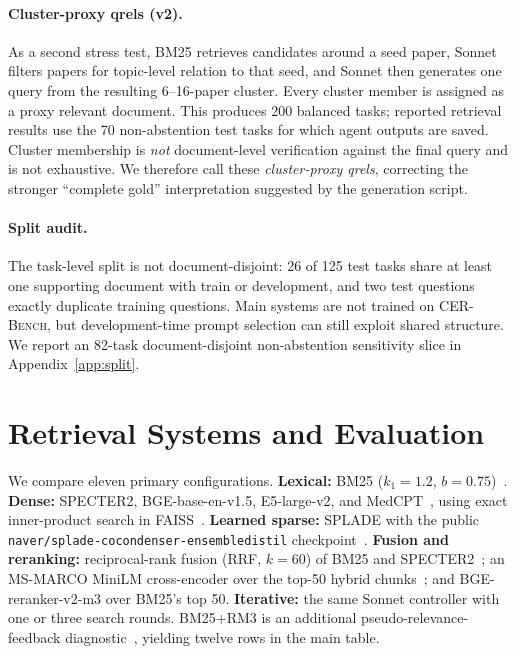 \documentclass{article}
\newcommand{\cer}{\textsc{CER-Bench}}
\begin{document}
\paragraph{Cluster-proxy qrels (v2).}
As a second stress test, BM25 retrieves candidates around a seed paper, Sonnet filters papers for topic-level relation to that seed, and Sonnet then generates one query from the resulting 6--16-paper cluster. Every cluster member is assigned as a proxy relevant document. This produces 200 balanced tasks; reported retrieval results use the 70 non-abstention test tasks for which agent outputs are saved. Cluster membership is \emph{not} document-level verification against the final query and is not exhaustive. We therefore call these \emph{cluster-proxy qrels}, correcting the stronger ``complete gold'' interpretation suggested by the generation script.

\paragraph{Split audit.}
The task-level split is not document-disjoint: 26 of 125 test tasks share at least one supporting document with train or development, and two test questions exactly duplicate training questions. Main systems are not trained on \cer, but development-time prompt selection can still exploit shared structure. We report an 82-task document-disjoint non-abstention sensitivity slice in Appendix~\ref{app:split}.

\section{Retrieval Systems and Evaluation}
\label{sec:methods}

We compare eleven primary configurations. \textbf{Lexical:} BM25 ($k_1{=}1.2$, $b{=}0.75$)~\cite{robertson2009}. \textbf{Dense:} SPECTER2, BGE-base-en-v1.5, E5-large-v2, and MedCPT~\cite{specter2,bge2024,e52022,medcpt2023}, using exact inner-product search in FAISS~\cite{johnson2019faiss}. \textbf{Learned sparse:} SPLADE with the public \texttt{naver/splade-cocondenser-ensembledistil} checkpoint~\cite{splade2022}. \textbf{Fusion and reranking:} reciprocal-rank fusion (RRF, $k{=}60$) of BM25 and SPECTER2~\cite{rrf2009}; an MS-MARCO MiniLM cross-encoder over the top-50 hybrid chunks~\cite{nogueira2019bert}; and BGE-reranker-v2-m3 over BM25's top 50. \textbf{Iterative:} the same Sonnet controller with one or three search rounds. BM25+RM3 is an additional pseudo-relevance-feedback diagnostic~\cite{abduljaleel2004rm3}, yielding twelve rows in the main table.
\end{document}
